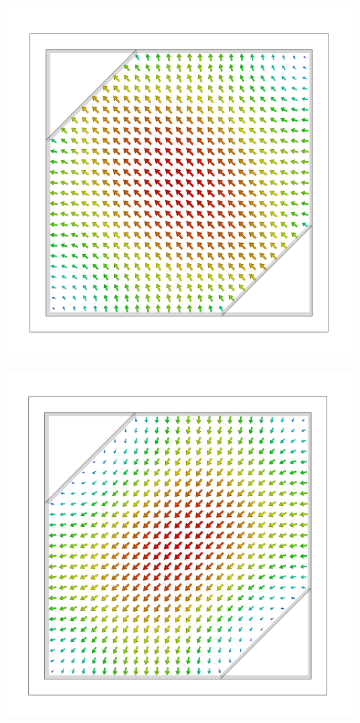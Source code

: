 \documentclass[11pt,a4paper,twoside,openany]{report}
\begin{document}
\begin{figure}
    \centering
    \begin{subfigure}{.45\textwidth}
        \centering
        \includegraphics[width=.7\textwidth]{src/polarizer_square_mode1.png}
        \caption{\label{fig:square-polarizer-mode1}}
    \end{subfigure}
    \hspace{0.5cm}
    \begin{subfigure}{.45\textwidth}
        \centering
        \includegraphics[width=.7\textwidth]{src/polarizer_square_mode2.png}
        \caption{\label{fig:square-polarizer-mode2}}
    \end{subfigure}
    \\
    \begin{subfigure}{.45\textwidth}
        \centering

\end{subfigure}
\end{figure}
\end{document}
